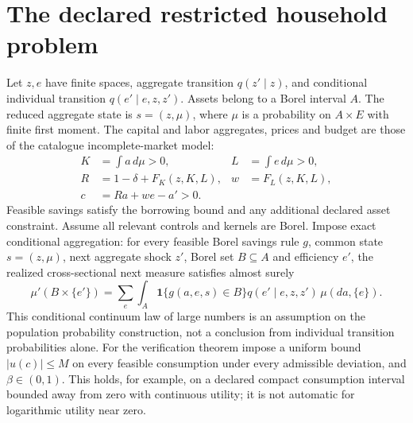 \documentclass[11pt]{article}
\theoremstyle{remark}
\newcommand{\Ind}{\mathbf 1}
\begin{document}
\section{The declared restricted household problem}
Let $z,e$ have finite spaces, aggregate transition $q(z'\mid z)$, and
conditional individual transition $q(e'\mid e,z,z')$. Assets belong to
a Borel interval $A$. The reduced aggregate state is $s=(z,\mu)$,
where $\mu$ is a probability on $A\times E$ with finite first moment.
The capital and labor aggregates, prices and budget are those of the
catalogue incomplete-market model:
\begin{align*}
 K&=\int a\,d\mu>0, & L&=\int e\,d\mu>0,\\
 R&=1-\delta+F_K(z,K,L), & w&=F_L(z,K,L),\\
 c&=Ra+we-a'>0.
\end{align*}
Feasible savings satisfy the borrowing bound and any additional declared
asset constraint. Assume all relevant controls and kernels are Borel.
Impose exact conditional aggregation: for every feasible Borel savings rule
$g$, common state $s=(z,\mu)$, next aggregate shock $z'$, Borel set
$B\subseteq A$ and efficiency $e'$, the realized cross-sectional next
measure satisfies almost surely
\[
 \mu'(B\times\{e'\})=
 \sum_e\int_A \Ind\{g(a,e,s)\in B\}
 q(e'\mid e,z,z')\,\mu(da,\{e\}).
\]
This conditional continuum law of large numbers is an assumption on the
population probability construction, not a conclusion from individual
transition probabilities alone.
For the verification theorem impose a uniform bound $|u(c)|\leq M$
on every feasible consumption under every admissible deviation, and
$\beta\in(0,1)$. This holds, for example, on a declared compact
consumption interval bounded away from zero with continuous utility;
it is not automatic for logarithmic utility near zero.
\end{document}
